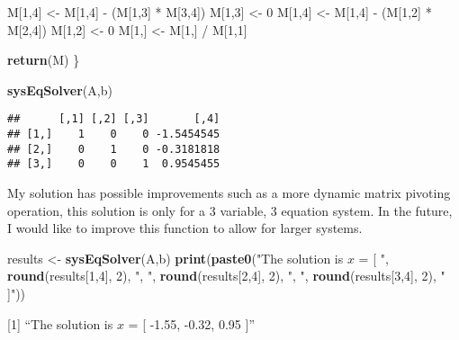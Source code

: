\documentclass[]{article}
\newenvironment{Shaded}{\begin{snugshade}}{\end{snugshade}}
\newcommand{\KeywordTok}[1]{\textcolor[rgb]{0.13,0.29,0.53}{\textbf{{#1}}}}
\newcommand{\DecValTok}[1]{\textcolor[rgb]{0.00,0.00,0.81}{{#1}}}
\newcommand{\StringTok}[1]{\textcolor[rgb]{0.31,0.60,0.02}{{#1}}}
\newcommand{\NormalTok}[1]{{#1}}
\begin{document}
\begin{Shaded}
\begin{Highlighting}[]
     \NormalTok{M[}\DecValTok{1}\NormalTok{,}\DecValTok{4}\NormalTok{] <-}\StringTok{ }\NormalTok{M[}\DecValTok{1}\NormalTok{,}\DecValTok{4}\NormalTok{] -}\StringTok{ }\NormalTok{(M[}\DecValTok{1}\NormalTok{,}\DecValTok{3}\NormalTok{] *}\StringTok{ }\NormalTok{M[}\DecValTok{3}\NormalTok{,}\DecValTok{4}\NormalTok{])}
     \NormalTok{M[}\DecValTok{1}\NormalTok{,}\DecValTok{3}\NormalTok{] <-}\StringTok{ }\DecValTok{0}
     \NormalTok{M[}\DecValTok{1}\NormalTok{,}\DecValTok{4}\NormalTok{] <-}\StringTok{ }\NormalTok{M[}\DecValTok{1}\NormalTok{,}\DecValTok{4}\NormalTok{] -}\StringTok{ }\NormalTok{(M[}\DecValTok{1}\NormalTok{,}\DecValTok{2}\NormalTok{] *}\StringTok{ }\NormalTok{M[}\DecValTok{2}\NormalTok{,}\DecValTok{4}\NormalTok{])}
     \NormalTok{M[}\DecValTok{1}\NormalTok{,}\DecValTok{2}\NormalTok{] <-}\StringTok{ }\DecValTok{0} 
     \NormalTok{M[}\DecValTok{1}\NormalTok{,] <-}\StringTok{ }\NormalTok{M[}\DecValTok{1}\NormalTok{,] /}\StringTok{ }\NormalTok{M[}\DecValTok{1}\NormalTok{,}\DecValTok{1}\NormalTok{]}
     
     \KeywordTok{return}\NormalTok{(M)}
  \NormalTok{\}}

\KeywordTok{sysEqSolver}\NormalTok{(A,b)}
\end{Highlighting}
\end{Shaded}

\begin{verbatim}
##      [,1] [,2] [,3]       [,4]
## [1,]    1    0    0 -1.5454545
## [2,]    0    1    0 -0.3181818
## [3,]    0    0    1  0.9545455
\end{verbatim}

My solution has possible improvements such as a more dynamic matrix
pivoting operation, this solution is only for a 3 variable, 3 equation
system. In the future, I would like to improve this function to allow
for larger systems.

\begin{Shaded}
\begin{Highlighting}[]
\NormalTok{results <-}\StringTok{ }\KeywordTok{sysEqSolver}\NormalTok{(A,b)}
\KeywordTok{print}\NormalTok{(}\KeywordTok{paste0}\NormalTok{(}\StringTok{"The solution is $x$ = [ "}\NormalTok{, }\KeywordTok{round}\NormalTok{(results[}\DecValTok{1}\NormalTok{,}\DecValTok{4}\NormalTok{], }\DecValTok{2}\NormalTok{), }\StringTok{", "}\NormalTok{,}
             \KeywordTok{round}\NormalTok{(results[}\DecValTok{2}\NormalTok{,}\DecValTok{4}\NormalTok{], }\DecValTok{2}\NormalTok{), }\StringTok{", "}\NormalTok{,}
             \KeywordTok{round}\NormalTok{(results[}\DecValTok{3}\NormalTok{,}\DecValTok{4}\NormalTok{], }\DecValTok{2}\NormalTok{), }\StringTok{" ]"}\NormalTok{))}
\end{Highlighting}
\end{Shaded}

{[}1{]} ``The solution is \(x\) = {[} -1.55, -0.32, 0.95 {]}''
\end{document}
